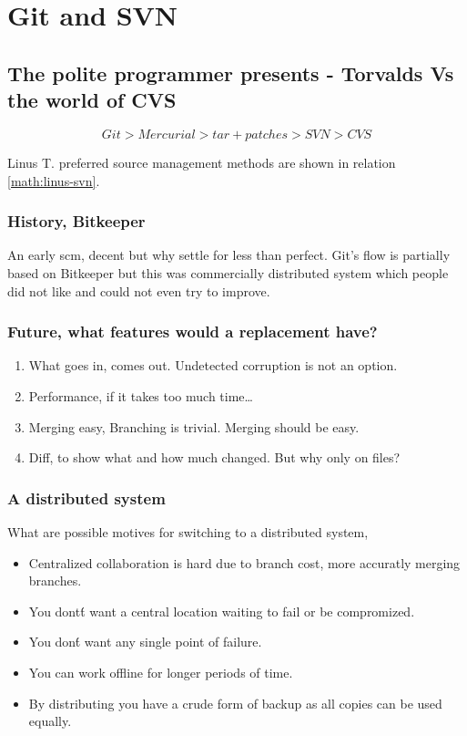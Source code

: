 
\section{Git and SVN}
\label{sect:leen}
\subsection{The polite programmer presents - Torvalds Vs the world of CVS}

\[
Git >  Mercurial > tar+patches > SVN > CVS
\label{math:linus-svn}
\]

Linus T. preferred source management methods are shown in relation \ref{math:linus-svn}.


\subsubsection{History, Bitkeeper}
An early scm, decent but why settle for less than perfect.
Git's flow is partially based on Bitkeeper but this was commercially distributed system which people did not like and could not even try to improve.

\subsubsection{Future, what features would a replacement have?}

\begin{enumerate}
  \item What goes in, comes out. Undetected corruption is not an option.
  \item Performance, if it takes too much time\ldots
  \item Merging easy, Branching is trivial. Merging should be easy.
  \item Diff, to show what and how much changed. But why only on files?
\end{enumerate}

\subsubsection{A distributed system}
What are possible motives for switching to a distributed system,
\begin{itemize}
 \item Centralized collaboration is hard due to branch cost, more accuratly merging branches.
 \item You dont\'t want a central location waiting to fail or be compromized.
 \item You don\'t want any single point of failure.
 \item You can work offline for longer periods of time.
 \item By distributing you have a crude form of backup as all copies can be used equally.
\end{itemize}

